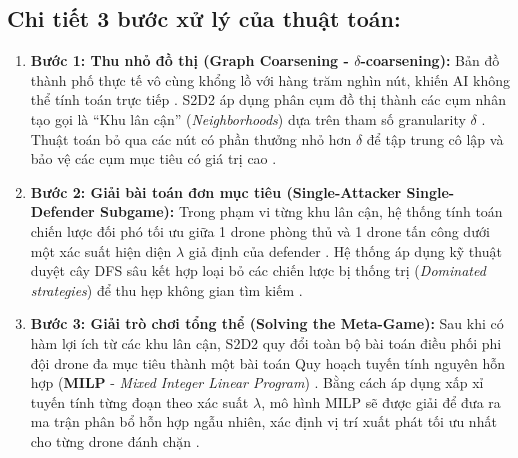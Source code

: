 \documentclass[../main.tex]{subfiles}
\begin{document}
\subsection*{Chi tiết 3 bước xử lý của thuật toán:}
\begin{enumerate}
    \item \textbf{Bước 1: Thu nhỏ đồ thị (Graph Coarsening - $\delta$-coarsening):} Bản đồ thành phố thực tế vô cùng khổng lồ với hàng trăm nghìn nút, khiến AI không thể tính toán trực tiếp \cite{mutzari2025defending}. S2D2 áp dụng phân cụm đồ thị thành các cụm nhân tạo gọi là ``Khu lân cận'' (\textit{Neighborhoods}) dựa trên tham số granularity $\delta$ \cite{mutzari2025defending}. Thuật toán bỏ qua các nút có phần thưởng nhỏ hơn $\delta$ để tập trung cô lập và bảo vệ các cụm mục tiêu có giá trị cao \cite{mutzari2025defending}.
    \item \textbf{Bước 2: Giải bài toán đơn mục tiêu (Single-Attacker Single-Defender Subgame):} Trong phạm vi từng khu lân cận, hệ thống tính toán chiến lược đối phó tối ưu giữa 1 drone phòng thủ và 1 drone tấn công dưới một xác suất hiện diện $\lambda$ giả định của defender \cite{korzhyk2010complexity}. Hệ thống áp dụng kỹ thuật duyệt cây DFS sâu kết hợp loại bỏ các chiến lược bị thống trị (\textit{Dominated strategies}) để thu hẹp không gian tìm kiếm \cite{mutzari2025defending}.
    \item \textbf{Bước 3: Giải trò chơi tổng thể (Solving the Meta-Game):} Sau khi có hàm lợi ích từ các khu lân cận, S2D2 quy đổi toàn bộ bài toán điều phối phi đội drone đa mục tiêu thành một bài toán Quy hoạch tuyến tính nguyên hỗn hợp (\textbf{MILP} - \textit{Mixed Integer Linear Program}) \cite{mutzari2025defending}. Bằng cách áp dụng xấp xỉ tuyến tính từng đoạn theo xác suất $\lambda$, mô hình MILP sẽ được giải để đưa ra ma trận phân bổ hỗn hợp ngẫu nhiên, xác định vị trí xuất phát tối ưu nhất cho từng drone đánh chặn \cite{mutzari2025defending}.
\end{enumerate}
\end{document}
